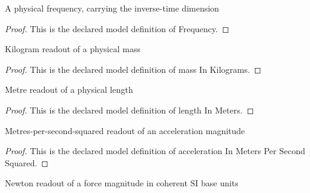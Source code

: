 \begin{definition}[Frequency]
  \label{def:physics:phyx-mini-0181:phyxminiproblems-problemphyxmini0181-frequency}
  A physical frequency, carrying the inverse-time dimension
\end{definition}
\begin{proof}
  This is the declared model definition of Frequency.
\end{proof}
\begin{definition}
  \label{def:physics:phyx-mini-0181:phyxminiproblems-problemphyxmini0181-massinkilograms}
  Kilogram readout of a physical mass
\end{definition}
\begin{proof}
  This is the declared model definition of mass In Kilograms.
\end{proof}
\begin{definition}
  \label{def:physics:phyx-mini-0181:phyxminiproblems-problemphyxmini0181-lengthinmeters}
  Metre readout of a physical length
\end{definition}
\begin{proof}
  This is the declared model definition of length In Meters.
\end{proof}
\begin{definition}
  \label{def:physics:phyx-mini-0181:phyxminiproblems-problemphyxmini0181-accelerationinmeterspersecondsquared}
  Metres-per-second-squared readout of an acceleration magnitude
\end{definition}
\begin{proof}
  This is the declared model definition of acceleration In Meters Per Second Squared.
\end{proof}
\begin{definition}
  \label{def:physics:phyx-mini-0181:phyxminiproblems-problemphyxmini0181-forceinnewtons}
  Newton readout of a force magnitude in coherent SI base units
\end{definition}
